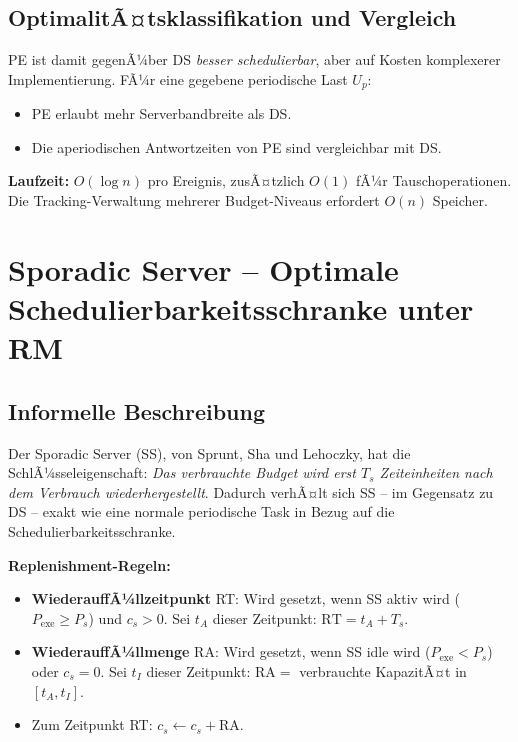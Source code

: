 ﻿\documentclass[a4paper,12pt]{report}
\theoremstyle{definition}
\begin{document}
\subsection{OptimalitÃ¤tsklassifikation und Vergleich}

PE ist damit gegenÃ¼ber DS \emph{besser schedulierbar}, aber auf Kosten
komplexerer Implementierung. FÃ¼r eine gegebene periodische Last $U_p$:
\begin{itemize}
	\item PE erlaubt mehr Serverbandbreite als DS.
	\item Die aperiodischen Antwortzeiten von PE sind vergleichbar mit DS.
\end{itemize}

\textbf{Laufzeit:} $O(\log n)$ pro Ereignis, zusÃ¤tzlich $O(1)$ fÃ¼r Tauschoperationen.
Die Tracking-Verwaltung mehrerer Budget-Niveaus erfordert $O(n)$ Speicher.

\section{Sporadic Server -- Optimale Schedulierbarkeitsschranke unter RM}

\subsection{Informelle Beschreibung}

Der Sporadic Server (SS), von Sprunt, Sha und Lehoczky, hat die SchlÃ¼sseleigenschaft:
\emph{Das verbrauchte Budget wird erst $T_s$ Zeiteinheiten nach dem Verbrauch
wiederhergestellt}. Dadurch verhÃ¤lt sich SS -- im Gegensatz zu DS -- exakt wie
eine normale periodische Task in Bezug auf die Schedulierbarkeitsschranke.

\textbf{Replenishment-Regeln:}
\begin{itemize}
	\item \textbf{WiederauffÃ¼llzeitpunkt} RT: Wird gesetzt, wenn SS aktiv wird
	      ($P_{\text{exe}} \geq P_s$) und $c_s > 0$. Sei $t_A$ dieser Zeitpunkt:
	      $\mathrm{RT} = t_A + T_s$.
	\item \textbf{WiederauffÃ¼llmenge} RA: Wird gesetzt, wenn SS idle wird ($P_{\text{exe}} < P_s$)
	      oder $c_s = 0$. Sei $t_I$ dieser Zeitpunkt:
	      $\mathrm{RA} = $ verbrauchte KapazitÃ¤t in $[t_A, t_I]$.
	\item Zum Zeitpunkt RT: $c_s \leftarrow c_s + \mathrm{RA}$.
\end{itemize}
\end{document}
